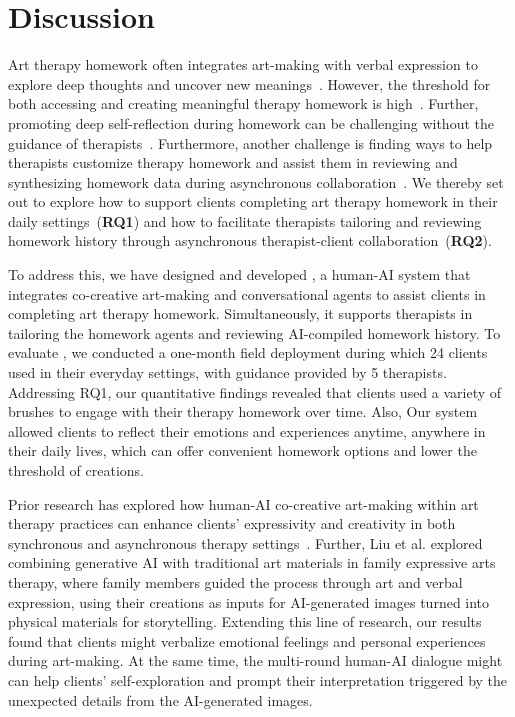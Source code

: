 \section{Discussion}
Art therapy homework often integrates art-making with verbal expression to explore deep thoughts and uncover new meanings~\cite{hoshino2011narrative,smith2019visual}.
However, the threshold for both accessing and creating meaningful therapy homework is high~\cite{du2024deepthink,Oewel_2024}. 
Further, promoting deep self-reflection during homework can be challenging without the guidance of therapists~\cite{kim2024mindfuldiary}.
Furthermore, another challenge is finding ways to help therapists customize therapy homework and assist them in reviewing and synthesizing homework data during asynchronous collaboration~\cite{Oewel_2024, freeman2007use}.
We thereby set out to explore how to support clients completing art therapy homework in their daily settings~(\textbf{RQ1}) and how to facilitate therapists tailoring and reviewing homework history through asynchronous therapist-client collaboration~(\textbf{RQ2}).

To address this, we have designed and developed \name{}, a human-AI system that integrates co-creative art-making and conversational agents to assist clients in completing art therapy homework. 
Simultaneously, it supports therapists in tailoring the homework agents and reviewing AI-compiled homework history. 
To evaluate \name{}, we conducted a one-month field deployment during which 24 clients used \name{} in their everyday settings, with guidance provided by 5 therapists. 
Addressing RQ1, our quantitative findings revealed that clients used a variety of brushes to engage with their therapy homework over time. Also, 
Our system allowed clients to reflect their emotions and experiences anytime, anywhere in their daily lives, which can offer convenient homework options and lower the threshold of creations.

Prior research has explored how human-AI co-creative art-making within art therapy practices can enhance clients' expressivity and creativity in both synchronous and asynchronous therapy settings~\cite{du2024deepthink}. Further, 
Liu et al. explored combining generative AI with traditional art materials in family expressive arts therapy, where family members guided the process through art and verbal expression, using their creations as inputs for AI-generated images turned into physical materials for storytelling. Extending this line of research, our results found that clients might verbalize emotional feelings and personal experiences during art-making. At the same time, the multi-round human-AI dialogue might can help clients' self-exploration and prompt their interpretation triggered by the unexpected details from the AI-generated images.

